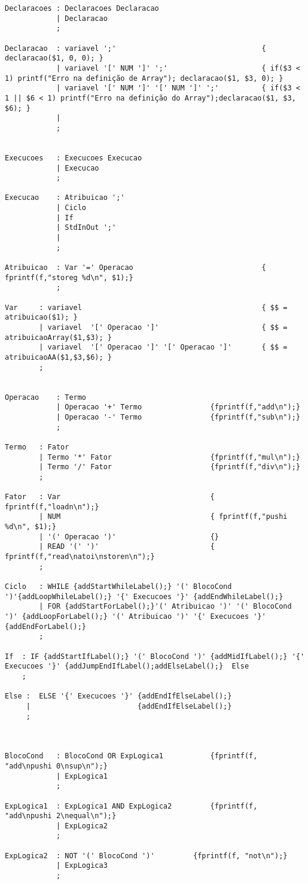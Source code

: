 \documentclass{report}
\begin{document}
\begin{verbatim}
Declaracoes : Declaracoes Declaracao
			| Declaracao
			;

Declaracao 	: variavel ';'									{ declaracao($1, 0, 0); }
			| variavel '[' NUM ']' ';'						{ if($3 < 1) printf("Erro na definição de Array"); declaracao($1, $3, 0); }
			| variavel '[' NUM ']' '[' NUM ']' ';'			{ if($3 < 1 || $6 < 1) printf("Erro na definição do Array");declaracao($1, $3, $6); }
			|
			;


Execucoes 	: Execucoes Execucao
			| Execucao
			;

Execucao  	: Atribuicao ';'
		  	| Ciclo
		  	| If
		  	| StdInOut ';'
		  	|
		  	;

Atribuicao  : Var '=' Operacao 								{ fprintf(f,"storeg %d\n", $1);}					
			;

Var 	: variavel 											{ $$ = atribuicao($1); }
		| variavel 	'[' Operacao ']'						{ $$ = atribuicaoArray($1,$3); }
		| variavel  '[' Operacao ']' '[' Operacao ']'		{ $$ = atribuicaoAA($1,$3,$6); }
		;


Operacao  	: Termo
		  	| Operacao '+' Termo				{fprintf(f,"add\n");}
		  	| Operacao '-' Termo				{fprintf(f,"sub\n");}
		  	;

Termo 	: Fator
	  	| Termo '*' Fator						{fprintf(f,"mul\n");}
	 	| Termo '/' Fator						{fprintf(f,"div\n");}
	 	;

Fator 	: Var 									{ fprintf(f,"loadn\n");}
	  	| NUM									{ fprintf(f,"pushi %d\n", $1);}
	  	| '(' Operacao ')'						{}
	  	| READ '(' ')'							{ fprintf(f,"read\natoi\nstoren\n");}
	  	;

Ciclo 	: WHILE {addStartWhileLabel();} '(' BlocoCond ')'{addLoopWhileLabel();} '{' Execucoes '}' {addEndWhileLabel();}
	  	| FOR {addStartForLabel();}'(' Atribuicao ')' '(' BlocoCond ')' {addLoopForLabel();} '(' Atribuicao ')' '{' Execucoes '}' {addEndForLabel();}
	  	;

If 	: IF {addStartIfLabel();} '(' BlocoCond ')' {addMidIfLabel();} '{' Execucoes '}' {addJumpEndIfLabel();addElseLabel();}  Else
   	;

Else :  ELSE '{' Execucoes '}' {addEndIfElseLabel();}
	 |			  			   {addEndIfElseLabel();}
	 ;



BlocoCond	: BlocoCond OR ExpLogica1			{fprintf(f, "add\npushi 0\nsup\n");}
			| ExpLogica1
			;

ExpLogica1	: ExpLogica1 AND ExpLogica2			{fprintf(f, "add\npushi 2\nequal\n");}
			| ExpLogica2
			;

ExpLogica2	: NOT '(' BlocoCond ')'			{fprintf(f, "not\n");}
			| ExpLogica3
			;


\end{verbatim}
\end{document}
